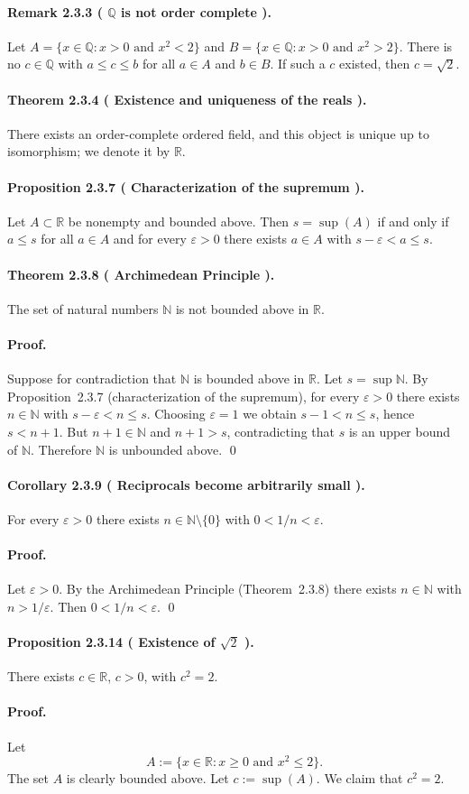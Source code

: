 \documentclass[12pt,a4paper]{article}
\newcommand{\N}{\mathbb{N}}
\newcommand{\Q}{\mathbb{Q}}
\newcommand{\R}{\mathbb{R}}
\newcommand{\eps}{\varepsilon}
\newcommand{\NumberedTheorem}[3]{%
\paragraph*{Theorem #1 ( #2 ).} #3\par}
\newcommand{\NumberedRemark}[3]{%
\paragraph*{Remark #1 ( #2 ).} #3\par}
\newcommand{\NumberedProposition}[3]{%
\paragraph*{Proposition #1 ( #2 ).} #3\par}
\newcommand{\NumberedCorollary}[3]{%
\paragraph*{Corollary #1 ( #2 ).} #3\par}
\theoremstyle{plain}
\theoremstyle{definition}
\theoremstyle{remark}
\begin{document}
\NumberedRemark{2.3.3}{\(\Q\) is not order complete}{Let $A=\{x\in\Q: x>0\text{ and }x^2<2\}$ and $B=\{x\in\Q: x>0\text{ and }x^2>2\}$. There is no $c\in\Q$ with $a\le c\le b$ for all $a\in A$ and $b\in B$. If such a $c$ existed, then $c=\sqrt{2}$.}

\NumberedTheorem{2.3.4}{Existence and uniqueness of the reals}{There exists an order-complete ordered field, and this object is unique up to isomorphism; we denote it by $\R$.}

\NumberedProposition{2.3.7}{Characterization of the supremum}{Let $A\subset \R$ be nonempty and bounded above. Then $s=\sup(A)$ if and only if $a\le s$ for all $a\in A$ and for every $\eps>0$ there exists $a\in A$ with $s-\eps < a \le s$.}

\NumberedTheorem{2.3.8}{Archimedean Principle}{The set of natural numbers $\N$ is not bounded above in $\R$.}

\paragraph{Proof.} Suppose for contradiction that $\N$ is bounded above in $\R$. Let $s=\sup \N$. By Proposition~2.3.7 (characterization of the supremum), for every $\eps>0$ there exists $n\in\N$ with $s-\eps < n \le s$. Choosing $\eps=1$ we obtain $s-1 < n \le s$, hence $s < n+1$. But $n+1\in\N$ and $n+1>s$, contradicting that $s$ is an upper bound of $\N$. Therefore $\N$ is unbounded above. \qed

\NumberedCorollary{2.3.9}{Reciprocals become arbitrarily small}{For every $\eps>0$ there exists $n\in\N\setminus\{0\}$ with $0<1/n<\eps$.}

\paragraph{Proof.} Let $\eps>0$. By the Archimedean Principle (Theorem~2.3.8) there exists $n\in\N$ with $n>1/\eps$. Then $0<1/n<\eps$. \qed

\NumberedProposition{2.3.14}{Existence of $\sqrt{2}$}{There exists $c\in\R$, $c>0$, with $c^2=2$.}

\paragraph{Proof.}
Let
\[
	A:=\{ x\in\R : x\ge 0 \text{ and } x^2\le 2\}.
\]
The set $A$ is clearly bounded above. Let $c:=\sup(A)$. We claim that $c^2=2$.
\end{document}
